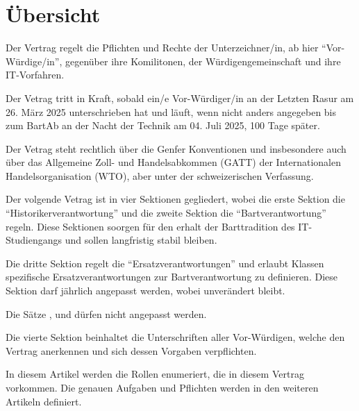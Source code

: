 \documentclass[fontsize=12pt,parskip=half]{scrartcl}
\begin{document}
\section{Übersicht}
\begin{contract}

  \Clause[title={Zweck}]
  Der Vertrag regelt die Pflichten und Rechte der Unterzeichner/in, ab hier ``Vor-Würdige/in'', gegenüber ihre Komilitonen, der Würdigengemeinschaft und ihre IT-Vorfahren.

  \Clause[title={Gültigkeit}]\label{gueltigkeit}
  Der Vetrag tritt in Kraft, sobald ein/e Vor-Würdiger/in an der Letzten Rasur am 26. März 2025 unterschrieben hat und läuft, wenn nicht anders angegeben bis zum BartAb
  an der Nacht der Technik am 04. Juli 2025, 100 Tage später.

  Der Vetrag steht rechtlich über die Genfer Konventionen und insbesondere auch über das Allgemeine Zoll- und Handelsabkommen (GATT) der Internationalen Handelsorganisation (WTO),
  aber unter der schweizerischen Verfassung.

  \Clause[title={Struktur}]
  Der volgende Vetrag ist in vier Sektionen gegliedert, wobei die erste Sektion die ``Historikerverantwortung'' und die zweite Sektion die ``Bartverantwortung'' regeln. Diese Sektionen
  soorgen für den erhalt der Barttradition des IT-Studiengangs und sollen langfristig stabil bleiben. \label{struktur.base}

  Die dritte Sektion regelt die ``Ersatzverantwortungen'' und erlaubt Klassen spezifische Ersatzverantwortungen zur Bartverantwortung zu definieren. Diese Sektion darf jährlich angepasst werden,
  wobei  unverändert bleibt.\label{struktur.ersatz}

  Die Sätze ,  und  dürfen nicht angepasst werden.\label{struktur.schutz}

  Die vierte Sektion beinhaltet die Unterschriften aller Vor-Würdigen, welche den Vertrag anerkennen und sich dessen Vorgaben verpflichten.

  \Clause[title={Rollen}]
  In diesem Artikel werden die Rollen enumeriert, die in diesem Vertrag vorkommen. Die genauen Aufgaben und Pflichten werden in den weiteren Artikeln definiert.


\end{contract}
\end{document}
